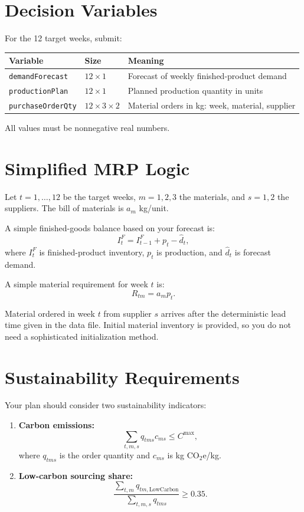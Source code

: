 \documentclass[11pt,a4paper]{article}
\newcommand{\COtwo}{\mathrm{CO_2e}}
\begin{document}
\section*{Decision Variables}
For the 12 target weeks, submit:
\begin{center}
\begin{tabular}{lll}
\toprule
Variable & Size & Meaning \\
\midrule
\texttt{demandForecast} & $12\times 1$ & Forecast of weekly finished-product demand \\
\texttt{productionPlan} & $12\times 1$ & Planned production quantity in units \\
\texttt{purchaseOrderQty} & $12\times 3\times 2$ & Material orders in kg: week, material, supplier \\
\bottomrule
\end{tabular}
\end{center}

All values must be nonnegative real numbers.

\section*{Simplified MRP Logic}
Let $t=1,\ldots,12$ be the target weeks, $m=1,2,3$ the materials, and $s=1,2$ the suppliers. The bill of materials is $a_m$ kg/unit.

A simple finished-goods balance based on your forecast is:
\begin{equation}
I^F_t = I^F_{t-1} + p_t - \widehat d_t,
\end{equation}
where $I^F_t$ is finished-product inventory, $p_t$ is production, and $\widehat d_t$ is forecast demand.

A simple material requirement for week $t$ is:
\begin{equation}
R_{tm} = a_m p_t.
\end{equation}

Material ordered in week $t$ from supplier $s$ arrives after the deterministic lead time given in the data file. Initial material inventory is provided, so you do not need a sophisticated initialization method.

\section*{Sustainability Requirements}
Your plan should consider two sustainability indicators:
\begin{enumerate}
    \item \textbf{Carbon emissions:}
    \begin{equation}
    \sum_{t,m,s} q_{tms} c_{ms} \le C^{\max},
    \end{equation}
    where $q_{tms}$ is the order quantity and $c_{ms}$ is kg $\COtwo$/kg.
    \item \textbf{Low-carbon sourcing share:}
    \begin{equation}
    \frac{\sum_{t,m} q_{tm,\mathrm{LowCarbon}}}{\sum_{t,m,s} q_{tms}} \ge 0.35.
    \end{equation}
\end{enumerate}
\end{document}
